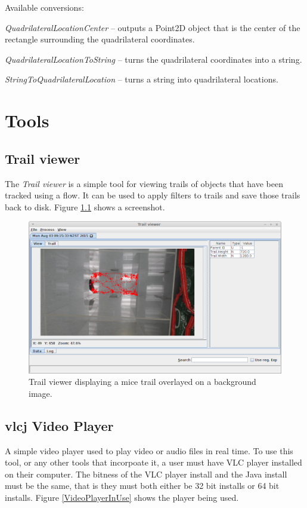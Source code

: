 \documentclass[a4paper]{book}
\begin{document}
\noindent Available conversions:
\begin{tight_itemize}
  \item \textit{QuadrilateralLocationCenter} -- outputs a Point2D object that
  is the center of the rectangle surrounding the quadrilateral coordinates.
  \item \textit{QuadrilateralLocationToString} -- turns the quadrilateral
  coordinates into a string.
  \item \textit{StringToQuadrilateralLocation} -- turns a string into quadrilateral
  locations.
\end{tight_itemize}

\chapter{Tools}

\section{Trail viewer}
The \textit{Trail viewer} is a simple tool for viewing trails of objects that
have been tracked using a flow. It can be used to apply filters to trails
and save those trails back to disk. Figure \ref{trail_viewer} shows a screenshot.

\begin{figure}[htb]
  \centering
  \includegraphics[width=12.0cm]{images/trail_viewer.png}
  \caption{Trail viewer displaying a mice trail overlayed on a background image.}
  \label{trail_viewer}
\end{figure}

\section{vlcj Video Player}
A simple video player used to play video or audio files in real time. To use this tool, or any other tools
that incorpoate it, a user must have VLC player installed on their computer.
The bitness of the VLC player install and the Java install must be the same, that is
they must both either be 32 bit installs or 64 bit installs. Figure \ref{VideoPlayerInUse} shows the player
being used.
\end{document}
